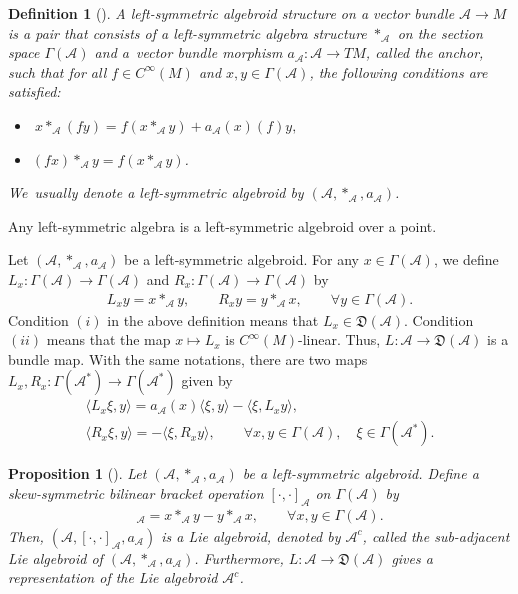 \documentclass[10pt,a4paper]{amsart}
\numberwithin{equation}{section}
\newtheorem{pro}[thm]{Proposition}
\newtheorem{defi}[thm]{Definition}
\newcommand{\huaA}{\mathcal{A}}
\newcommand{\frkD}{\mathfrak D}
\newcommand{\CWM}{C^{\infty}(M)}
\begin{document}
\begin{defi}[\cite{LiuShengBaiChen,Boyom1}]%
A {\it left-symmetric algebroid} structure on a vector bundle
$\huaA\longrightarrow M$ is a pair that consists of a left-symmetric
algebra structure $\ast_\huaA$ on the section space $\Gamma(\huaA)$ and a~vector bundle morphism $a_\huaA\colon \huaA\longrightarrow TM$, called the anchor,
such that for all $f\in\CWM$ and $x,y\in\Gamma(\huaA)$, the following
conditions are satisfied:
\begin{itemize}\itemsep=0pt
\item[$(i)$]$~x\ast_\huaA(fy)=f(x\ast_\huaA y)+a_\huaA(x)(f)y,$
\item[$(ii)$] $(fx)\ast_\huaA y=f(x\ast_\huaA y)$.
\end{itemize}
We~usually denote a left-symmetric algebroid by $(\huaA,\ast_\huaA, a_\huaA)$.
\end{defi}
Any left-symmetric algebra is a left-symmetric algebroid over a point.

Let $(\huaA,\ast_\huaA, a_\huaA)$ be a left-symmetric algebroid. For any $x\in\Gamma(\huaA)$, we define
$L_x\colon \Gamma(\huaA)\longrightarrow\Gamma(\huaA)$ and $R_x\colon \Gamma(\huaA)\longrightarrow\Gamma(\huaA)$ by
\begin{gather*}%
L_xy=x\ast_\huaA y,\qquad
R_xy=y\ast_\huaA x,\qquad
\forall y\in\Gamma(\huaA).
\end{gather*}
Condition $(i)$ in the above definition means that $L_x\in \frkD(\huaA)$.
Condition $(ii)$ means that the map $x\longmapsto L_x$ is
$C^\infty(M)$-linear. Thus, $L\colon \huaA\longrightarrow \frkD(\huaA)$ is a bundle
map. With the same notations, there are two maps $L_x,R_x\colon \Gamma(\huaA^*)\longrightarrow\Gamma(\huaA^*)$ given by
\begin{gather}
\langle L_x \xi,y\rangle=a_\huaA(x)\langle\xi,y\rangle-\langle \xi,L_x y\rangle,\nonumber
\\
\langle R_x \xi,y\rangle=-\langle \xi,R_x y\rangle,\qquad
\forall x,y\in\Gamma(\huaA),\quad \xi\in\Gamma(\huaA^*).\label{eq:dualLR}
\end{gather}

\begin{pro}[\cite{LiuShengBaiChen}]%
 Let $(\huaA,\ast_\huaA, a_\huaA)$ be a left-symmetric algebroid. Define a skew-symmetric bilinear bracket operation $[\cdot,\cdot]_\huaA$ on $\Gamma(\huaA)$ by
\begin{gather*}
 [x,y]_\huaA=x\ast_{\huaA} y-y\ast_{\huaA} x,\qquad
 \forall x,y\in\Gamma(\huaA).
\end{gather*}
Then, $(\huaA,[\cdot,\cdot]_\huaA,a_\huaA)$ is a Lie algebroid, denoted by
$\huaA^c$, called the {\it sub-adjacent Lie algebroid} of
 $(\huaA,\ast_\huaA,a_\huaA)$. Furthermore, $L\colon \huaA\longrightarrow \frkD(\huaA)$ gives a
 representation of the Lie algebroid $\huaA^c$.
\end{pro}
\end{document}
